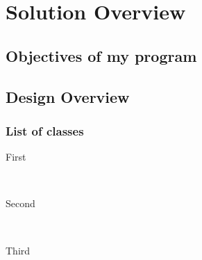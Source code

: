 \documentclass[12pt]{article} %
\begin{document}
\section{Solution Overview} %


\subsection{Objectives of my program} %



\subsection{Design Overview}
\subsubsection{List of classes}

\begin{description} %

\item[First] \hfill \\


\item[Second] \hfill \\


\item[Third] \hfill \\


\end{description} 


\newpage





\end{document}
